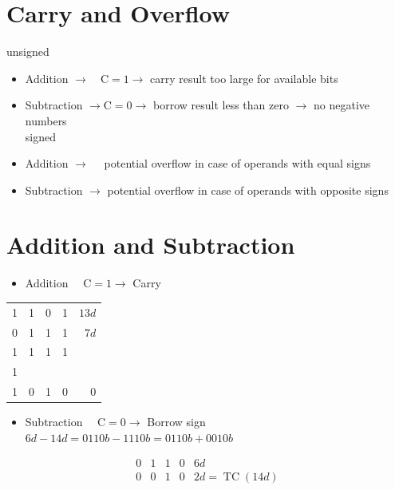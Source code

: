 \documentclass[10pt]{article}
\begin{document}
\section*{Carry and Overflow}
unsigned

\begin{itemize}
  \item Addition $\rightarrow \quad \mathrm{C}=1 \rightarrow$ carry result too large for available bits
  \item Subtraction $\rightarrow \mathrm{C}=0 \rightarrow$ borrow result less than zero $\rightarrow$ no negative numbers\\
signed
  \item Addition $\rightarrow \quad$ potential overflow in case of operands with equal signs
  \item Subtraction $\rightarrow$ potential overflow in case of operands with opposite signs
\end{itemize}

\section*{Addition and Subtraction}
\begin{itemize}
  \item Addition $\quad \mathrm{C}=1 \rightarrow$ Carry
\end{itemize}

\begin{center}
\begin{tabular}{|rrrrr|}
\hline
1 & 1 & 0 & 1 & $13 d$ \\
0 & 1 & 1 & 1 & $7 d$ \\
1 & 1 & 1 & 1 &  \\
1 &  &  &  &  \\
1 & 0 & 1 & 0 & 0 \\
\end{tabular}
\end{center}

\begin{itemize}
  \item Subtraction $\quad \mathrm{C}=0 \rightarrow$ Borrow sign\\
$6 d-14 d=0110 b-1110 b=0110 b+0010 b$
\end{itemize}

$$
\begin{array}{llllll}
0 & 1 & 1 & 0 & 6 d \\
0 & 0 & 1 & 0 & 2 d=\operatorname{TC}(14 d)
\end{array}
$$
\end{document}
